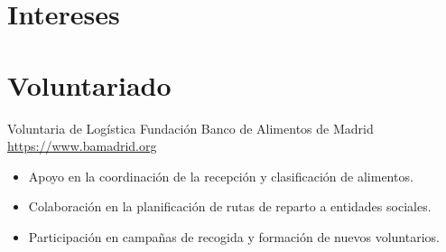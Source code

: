 \documentclass[a4paper, serif, 10pt]{moderncv}
\begin{document}
\section{Intereses}

\section{Voluntariado}

        {Voluntaria de Logística}
        {Fundación Banco de Alimentos de Madrid}
        {\url{https://www.bamadrid.org}}
        {}
        {\begin{itemize}
\item Apoyo en la coordinación de la recepción y clasificación de alimentos.
\item Colaboración en la planificación de rutas de reparto a entidades sociales.
\item Participación en campañas de recogida y formación de nuevos voluntarios.
\end{itemize}}
    
\end{document}
